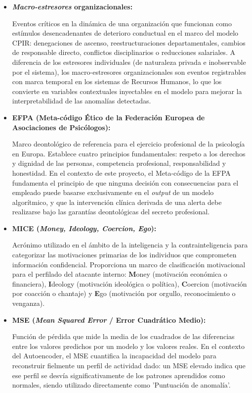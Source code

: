 \documentclass[IB]{TFUOC}%
\begin{document}
\begin{itemize}
    \item \textbf{\textit{Macro-estresores} organizacionales:}
    
    Eventos críticos en la dinámica de una organización que funcionan como estímulos desencadenantes de deterioro conductual en el marco del modelo CPIR: denegaciones de 
    ascenso, reestructuraciones departamentales, cambios de responsable directo, conflictos disciplinarios o reducciones salariales. A diferencia de los estresores individuales 
    (de naturaleza privada e inobservable por el sistema), los macro-estresores organizacionales son eventos registrables con marca temporal en los sistemas de Recursos Humanos, lo que los convierte en variables contextuales inyectables en el modelo para mejorar la interpretabilidad de las anomalías detectadas.

    \item \textbf{EFPA (Meta-código Ético de la Federación Europea 
    de Asociaciones de Psicólogos):}
    
    Marco deontológico de referencia para el ejercicio profesional de la psicología en Europa. Establece cuatro principios fundamentales: respeto a los derechos y dignidad de las personas, competencia profesional, responsabilidad y honestidad. En el contexto de este proyecto, el Meta-código de la EFPA fundamenta el principio de que ninguna decisión 
    con consecuencias para el empleado puede basarse exclusivamente en el \textit{output} de un modelo algorítmico, y que la intervención clínica derivada de una alerta debe 
    realizarse bajo las garantías deontológicas del secreto profesional.

    \item \textbf{MICE (\textit{Money, Ideology, Coercion, Ego}):}
    
    Acrónimo utilizado en el ámbito de la inteligencia y la contrainteligencia para categorizar las motivaciones primarias de los individuos que comprometen información confidencial. Proporciona un marco de clasificación motivacional para el perfilado del atacante interno: \textbf{M}oney (motivación económica o financiera), \textbf{I}deology (motivación ideológica o política), \textbf{C}oercion (motivación por coacción o chantaje) y \textbf{E}go (motivación por orgullo, reconocimiento o venganza).

    \item \textbf{MSE (\textit{Mean Squared Error} / Error Cuadrático Medio):}
    
    Función de pérdida que mide la media de los cuadrados de las diferencias entre los valores predichos por un modelo y los valores reales. En el contexto del Autoencoder, el MSE cuantifica la incapacidad del modelo para reconstruir fielmente un perfil de actividad dado: un MSE elevado indica que ese perfil se desvía significativamente de los patrones aprendidos como normales, siendo utilizado directamente como 'Puntuación de anomalía'.


\end{itemize}
\end{document}
